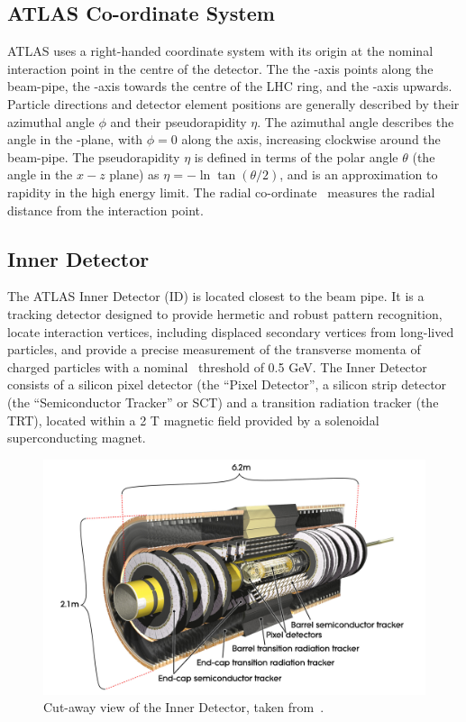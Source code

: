 \subsection{ATLAS Co-ordinate System}
ATLAS uses a right-handed coordinate system with its origin at the nominal
interaction point in the centre of the detector. The 
the \z-axis points along the beam-pipe, the \x-axis towards the 
centre of the LHC ring, and the \y-axis upwards. Particle directions and
detector element positions are generally described by their azimuthal angle
$\phi$ and their pseudorapidity $\eta$. The azimuthal angle describes the angle
in the \x-\y plane, with $\phi=0$ along the \x axis, increasing clockwise
around the beam-pipe.
The pseudorapidity $\eta$ is defined in terms of the polar angle $\theta$ (the
angle in the $x-z$ plane) as $\eta = - \ln\tan(\theta/2)$, and is an
approximation to rapidity in the high energy limit.
The radial co-ordinate \R\ measures the radial distance from the interaction
point. 

\subsection{Inner Detector}

The ATLAS Inner Detector (ID) is located closest to the beam pipe. It is a tracking
detector designed to provide hermetic and robust pattern recognition, locate
interaction vertices, including displaced secondary vertices from long-lived
particles, and provide a precise measurement of the transverse momenta of charged
particles with a nominal \pt\ threshold of 0.5 GeV. The Inner Detector consists
of a silicon pixel detector (the ``Pixel Detector'', a silicon strip detector (the ``Semiconductor
Tracker'' or SCT) and a transition radiation tracker (the TRT), located within a
2 T magnetic field provided by a solenoidal superconducting magnet.

\begin{figure}[h]
\centering
\includegraphics[width=\textwidth]{ID_newTRT_d3}
\caption{Cut-away view of the Inner Detector, taken from~\cite{Aad:1125884}.}
\label{fig:id-1}
\end{figure}

